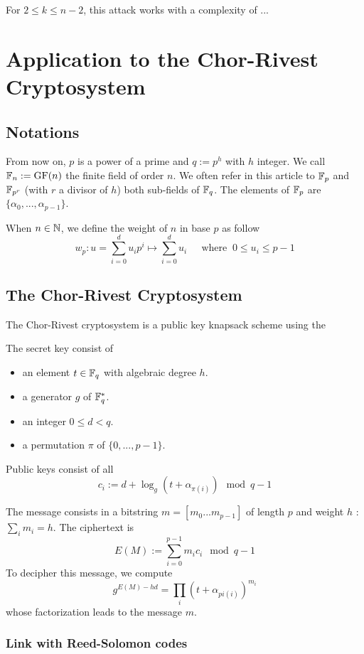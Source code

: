 \documentclass[12pt,a4paper,titlepage]{article}
\newcommand{\GF}[1]{\F_{#1}}
\begin{document}
For $2 \leq k \leq n-2$, this attack works with a complexity of ...


\newpage
\section{Application to the Chor-Rivest Cryptosystem}
\label{sec:CRcrypt}

\subsection{Notations}

From now on, $p$ is a power of a prime and $q := p^h$ with $h$ integer. We call $\mathbb{F}_n := \text{GF}(n)$ the finite field of order $n$. We often refer in this article to $\mathbb{F}_p$ and $\mathbb{F}_{p^r}$ (with $r$ a divisor of $h$) both sub-fields of $\mathbb{F}_q$. The elements of $\mathbb{F}_p$ are $\{ \alpha_0, ... , \alpha_{p-1} \}$.

When $n \in \mathbb{N}$, we define the weight of $n$ in base $p$ as follow
$$ w_p : u = \sum_{i=0}^{d} u_i p^i \longmapsto \sum_{i=0}^{d} u_i \ \ \ \ \ \text{ where }  \ 0 \leq u_i \leq p-1 $$

\subsection{The Chor-Rivest Cryptosystem}

The Chor-Rivest cryptosystem is a public key knapsack scheme using the 


The secret key consist of
\begin{itemize}
\item an element $t \in \GF{q}$ with algebraic degree $h$.
\item a generator $g$ of $\GF{q}^{*}$.
\item an integer $0 \leq d < q$.
\item a permutation $\pi$ of $\{ 0, ... , p-1 \}$.
\end{itemize}

Public keys consist of all
$$ c_i := d + \log_g(t + \alpha_{\pi(i)}) \mod q-1 $$

The message consists in a bitstring $m = [m_0...m_{p-1}]$ of length $p$ and weight $h$ : $\sum_i m_i = h$. The ciphertext is
$$ E(M) := \sum_{i=0}^{p-1} m_i c_i \mod q-1 $$
To decipher this message, we compute
$$ g^{E(M) - hd} =  \prod_i \left( t + \alpha_{pi(i)}\right)^{m_i} $$
whose factorization leads to the message $m$.


\subsubsection{Link with Reed-Solomon codes}
\end{document}
